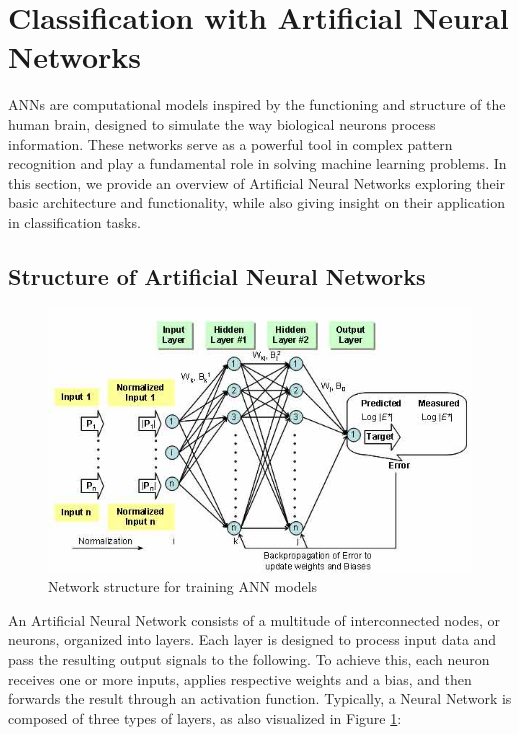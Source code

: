 \documentclass[12pt,fleqn,a4paper]{article}
\begin{document}
\section{Classification with Artificial Neural Networks}
ANNs are computational models inspired by the functioning and structure of the human brain, designed to simulate the way biological neurons process information. These networks serve as a powerful tool in complex pattern recognition and play a fundamental role in solving machine learning problems.  In this section, we provide an overview of Artificial Neural Networks exploring their basic architecture and functionality, while also giving insight on their application in classification tasks.

\subsection{Structure of Artificial Neural Networks}

\begin{figure}[H]
    \centering
    \includegraphics[width=0.56\linewidth]{graphs/annStructure.jpg}
    \caption{Network structure for training ANN models  \cite{FHWA}}
    \label{fig:annStruct}
\end{figure}

An Artificial Neural Network consists of a multitude of interconnected nodes, or neurons, organized into layers. Each layer is designed to process input data and pass the resulting output signals to the following. To achieve this, each neuron receives one or more inputs, applies respective weights and a bias, and then forwards the result through an activation function. Typically, a Neural Network is composed of three types of layers, as also visualized in Figure \ref{fig:annStruct}:
\end{document}

